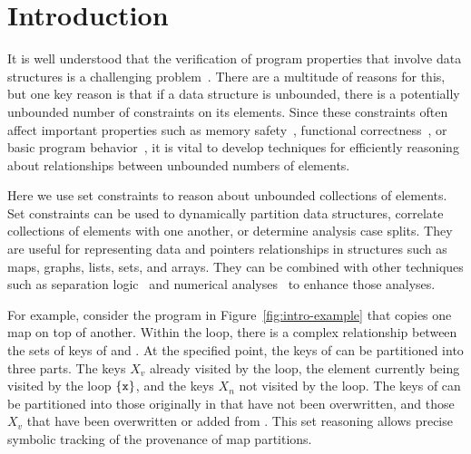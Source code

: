 \section{Introduction}
\label{s:1:intro}


It is well understood that the verification of program properties that
involve data structures is a challenging problem~\cite{jahob:thesis:07,compass:popl:11,fixbag:cav:11,celia:vmcai:12,ab:ecoop:13,hoo:14:sas,memcad:15:sas}.
There are a multitude of reasons for this, but one key reason is that
if a data structure is unbounded, there is a potentially unbounded number of constraints on its elements.  Since these constraints often affect important properties such as memory safety~\cite{memcad:15:sas}, functional correctness~\cite{fixbag:cav:11}, or basic program behavior~\cite{hoo:14:sas}, it is vital to develop techniques for efficiently reasoning about relationships between unbounded numbers of elements.

Here we use set constraints to reason about unbounded collections of elements.  Set constraints can be used to dynamically partition data structures, correlate collections of elements with one another, or determine analysis case splits.  They are useful for representing data and pointers relationships in structures such as maps, graphs, lists, sets, and arrays.  They can be combined with other techniques such as separation logic~\cite{hoo:14:sas,memcad:15:sas} and numerical analyses~\cite{quicr:cav:14} to enhance those analyses.

For example, consider the program in Figure~\ref{fig:intro-example}
that copies one map on top of another.
Within the loop, there is a complex relationship between the sets of
keys of  and .
At the specified point, the keys of  can be partitioned into
three parts.
The keys $X_v$ already visited by the loop, the element currently being
visited by the loop $\{\texttt{x}\}$, and the keys $X_n$ not visited by
the loop.
The keys of  can be partitioned into those originally in
 that have not been overwritten, and those $X_v$ that have
been overwritten or added from .
This set reasoning allows precise symbolic tracking of the provenance
of map partitions.

